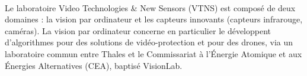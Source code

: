 \paragraph{} Le laboratoire Video Technologies \& New Sensors (VTNS) est compos\'e de deux domaines : la vision par ordinateur et les capteurs innovants (capteurs infrarouge, cam\'eras). La vision par ordinateur concerne en particulier le d\'eveloppent d'algorithmes pour des solutions de vid\'eo-protection et pour des drones, via un laboratoire commun entre Thales et le Commissariat \`a l'\'Energie Atomique et aux \'Energies Alternatives (CEA), baptis\'e VisionLab.








